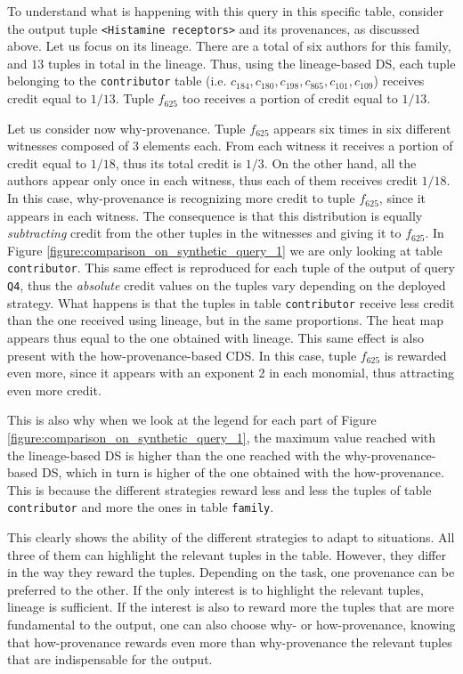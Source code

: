 To understand what is happening with this query in this specific table, consider the output tuple \texttt{<Histamine receptors>} and its provenances, as discussed above.
Let us focus on its lineage. There are a total of six authors for this family, and $13$ tuples in total in the lineage. 
Thus, using the lineage-based DS, each tuple belonging to the \texttt{contributor} table (i.e. $c_{184}, c_{180}, c_{198}, c_{865}, c_{101}, c_{109}$) receives credit equal to $1/13$.
Tuple $f_{625}$ too receives a portion of credit equal to $1/13$.

Let us consider now why-provenance. Tuple $f_{625}$ appears six times in six different witnesses composed of $3$ elements each. From each witness it receives a portion of credit equal to $1/18$, thus its total credit is $1/3$.
On the other hand, all the authors appear only once in each witness, thus each of them receives credit $1/18$. 
In this case, why-provenance is recognizing more credit to tuple $f_{625}$, since it appears in each witness. The consequence is that this distribution is equally \emph{subtracting} credit from the other tuples in the witnesses and giving it to $f_{625}$. 
In Figure \ref{figure:comparison_on_synthetic_query_1} we are only looking at table \texttt{contributor}. 
This same effect is reproduced for each tuple of the output of query \texttt{Q4}, thus the \emph{absolute} credit values on the tuples vary depending on the deployed strategy. 
What happens is that the tuples in table \texttt{contributor} receive less credit than the one received using lineage, but in the same proportions. The heat map appears thus equal to the one obtained with lineage.
This same effect is also present with the how-provenance-based CDS. In this case, tuple $f_{625}$ is rewarded even more, since it appears with an exponent 2 in each monomial, thus attracting even more credit. 

This is also why when we look at the legend for each part of Figure \ref{figure:comparison_on_synthetic_query_1}, the maximum value reached with the lineage-based DS is higher than the one reached with the why-provenance-based DS, which in turn is higher of the one obtained with the how-provenance. This is because the different strategies reward less and less the tuples of table \texttt{contributor} and more the ones in table \texttt{family}. 

This clearly shows the ability of the different strategies to adapt to situations. All three of them can highlight the relevant tuples in the table. However, they differ in the way they reward the tuples. 
Depending on the task, one provenance can be preferred to the other. 
If the only interest is to highlight the relevant tuples, lineage is sufficient. 
If the interest is also to reward more the tuples that are more fundamental to the output, one can also choose why- or how-provenance, knowing that how-provenance rewards even more than why-provenance the relevant tuples that are indispensable for the output.  

